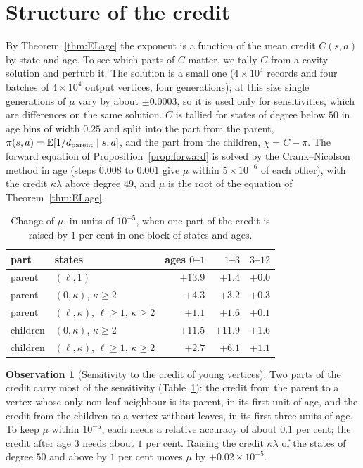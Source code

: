 \documentclass[11pt]{article}
\theoremstyle{plain}
\theoremstyle{definition}
\newtheorem{observation}[theorem]{Observation}
\theoremstyle{remark}
\begin{document}
\section{Structure of the credit}\label{sec:dynamics}

By Theorem~\ref{thm:ELage} the exponent is a function of the mean credit $C(s,a)$ by state and age. To see which parts of $C$ matter, we tally $C$ from a cavity solution and perturb it. The solution is a small one ($4\times10^4$ records and four batches of $4\times10^4$ output vertices, four generations); at this size single generations of $\mu$ vary by about $\pm0.0003$, so it is used only for sensitivities, which are differences on the same solution. $C$ is tallied for states of degree below $50$ in age bins of width $0.25$ and split into the part from the parent, $\pi(s,a)=\mathbb E[1/d_{\rm parent}\mid s,a]$, and the part from the children, $\chi=C-\pi$. The forward equation of Proposition~\ref{prop:forward} is solved by the Crank--Nicolson method in age (steps $0.008$ to $0.001$ give $\mu$ within $5\times10^{-6}$ of each other), with the credit $\kappa\lambda$ above degree $49$, and $\mu$ is the root of the equation of Theorem~\ref{thm:ELage}.

\begin{table}[H]
\centering
\begin{tabular}{llrrr}
\toprule
part & states & ages $0$--$1$ & $1$--$3$ & $3$--$12$\\
\midrule
parent & $(\ell,1)$ & $+13.9$ & $+1.4$ & $+0.0$\\
parent & $(0,\kappa)$, $\kappa\ge2$ & $+4.3$ & $+3.2$ & $+0.3$\\
parent & $(\ell,\kappa)$, $\ell\ge1$, $\kappa\ge2$ & $+1.1$ & $+1.6$ & $+0.1$\\
children & $(0,\kappa)$, $\kappa\ge2$ & $+11.5$ & $+11.9$ & $+1.6$\\
children & $(\ell,\kappa)$, $\ell\ge1$, $\kappa\ge2$ & $+2.7$ & $+6.1$ & $+1.1$\\
\bottomrule
\end{tabular}
\caption{Change of $\mu$, in units of $10^{-5}$, when one part of the credit is raised by $1$ per cent in one block of states and ages.}\label{tab:sens}
\end{table}

\begin{observation}[Sensitivity to the credit of young vertices]\label{obs:young}
Two parts of the credit carry most of the sensitivity (Table~\ref{tab:sens}): the credit from the parent to a vertex whose only non-leaf neighbour is its parent, in its first unit of age, and the credit from the children to a vertex without leaves, in its first three units of age. To keep $\mu$ within $10^{-5}$, each needs a relative accuracy of about $0.1$ per cent; the credit after age $3$ needs about $1$ per cent. Raising the credit $\kappa\lambda$ of the states of degree $50$ and above by $1$ per cent moves $\mu$ by $+0.02\times10^{-5}$.
\end{observation}
\end{document}
